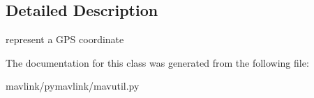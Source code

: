 \subsection{Detailed Description}
\begin{DoxyVerb}represent a GPS coordinate\end{DoxyVerb}
 

The documentation for this class was generated from the following file\+:\begin{DoxyCompactItemize}
\item 
mavlink/pymavlink/mavutil.\+py\end{DoxyCompactItemize}
